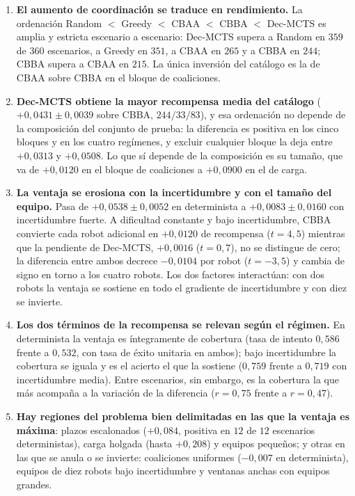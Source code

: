 \begin{enumerate}
    \item \textbf{El aumento de coordinación se traduce en rendimiento.} La ordenación Random $<$ Greedy $<$ CBAA $<$ CBBA $<$ Dec-MCTS es amplia y estricta escenario a escenario: Dec-MCTS supera a Random en $359$ de $360$ escenarios, a Greedy en $351$, a CBAA en $265$ y a CBBA en $244$; CBBA supera a CBAA en $215$. La única inversión del catálogo es la de CBAA sobre CBBA en el bloque de coaliciones.
    \item \textbf{Dec-MCTS obtiene la mayor recompensa media del catálogo} ($+0{,}0431 \pm 0{,}0039$ sobre CBBA, $244/33/83$), y esa ordenación no depende de la composición del conjunto de prueba: la diferencia es positiva en los cinco bloques y en los cuatro regímenes, y excluir cualquier bloque la deja entre $+0{,}0313$ y $+0{,}0508$. Lo que sí depende de la composición es su tamaño, que va de $+0{,}0120$ en el bloque de coaliciones a $+0{,}0900$ en el de carga.
    \item \textbf{La ventaja se erosiona con la incertidumbre y con el tamaño del equipo.} Pasa de $+0{,}0538 \pm 0{,}0052$ en determinista a $+0{,}0083 \pm 0{,}0160$ con incertidumbre fuerte. A dificultad constante y bajo incertidumbre, CBBA convierte cada robot adicional en $+0{,}0120$ de recompensa ($t=4{,}5$) mientras que la pendiente de Dec-MCTS, $+0{,}0016$ ($t=0{,}7$), no se distingue de cero; la diferencia entre ambos decrece $-0{,}0104$ por robot ($t=-3{,}5$) y cambia de signo en torno a los cuatro robots. Los dos factores interactúan: con dos robots la ventaja se sostiene en todo el gradiente de incertidumbre y con diez se invierte.
    \item \textbf{Los dos términos de la recompensa se relevan según el régimen.} En determinista la ventaja es íntegramente de cobertura (tasa de intento $0{,}586$ frente a $0{,}532$, con tasa de éxito unitaria en ambos); bajo incertidumbre la cobertura se iguala y es el acierto el que la sostiene ($0{,}759$ frente a $0{,}719$ con incertidumbre media). Entre escenarios, sin embargo, es la cobertura la que más acompaña a la variación de la diferencia ($r=0{,}75$ frente a $r=0{,}47$).
    \item \textbf{Hay regiones del problema bien delimitadas en las que la ventaja es máxima}: plazos escalonados ($+0{,}084$, positiva en $12$ de $12$ escenarios deterministas), carga holgada (hasta $+0{,}208$) y equipos pequeños; y otras en las que se anula o se invierte: coaliciones uniformes ($-0{,}007$ en determinista), equipos de diez robots bajo incertidumbre y ventanas anchas con equipos grandes.

\end{enumerate}
